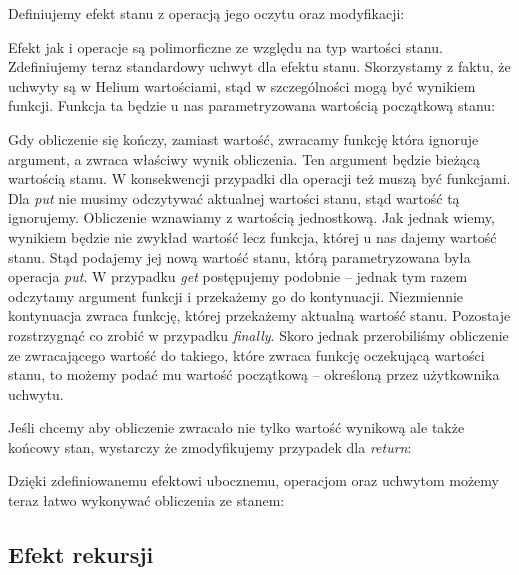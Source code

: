 Definiujemy efekt stanu z operacją jego oczytu oraz modyfikacji:



Efekt jak i operacje są polimorficzne ze względu na typ wartości stanu. Zdefiniujemy teraz standardowy uchwyt dla efektu stanu. Skorzystamy z faktu, że uchwyty są w Helium wartościami, stąd w szczególności mogą być wynikiem funkcji. Funkcja ta będzie u nas parametryzowana wartością początkową stanu:



Gdy obliczenie się kończy, zamiast wartość, zwracamy funkcję która ignoruje argument, a zwraca właściwy wynik obliczenia. Ten argument będzie bieżącą wartością stanu. W konsekwencji przypadki dla operacji też muszą być funkcjami. Dla \textit{put} nie musimy odczytywać aktualnej wartości stanu, stąd wartość tą ignorujemy. Obliczenie wznawiamy z wartością jednostkową. Jak jednak wiemy, wynikiem będzie nie zwykład wartość lecz funkcja, której u nas dajemy wartość stanu. Stąd podajemy jej nową wartość stanu, którą parametryzowana była operacja \textit{put}. W przypadku \textit{get} postępujemy podobnie -- jednak tym razem odczytamy argument funkcji i przekażemy go do kontynuacji. Niezmiennie kontynuacja zwraca funkcję, której przekażemy aktualną wartość stanu. Pozostaje rozstrzygnąć co zrobić w przypadku \textit{finally}. Skoro jednak przerobiliśmy obliczenie ze zwracającego wartość do takiego, które zwraca funkcję oczekującą wartości stanu, to możemy podać mu wartość początkową -- określoną przez użytkownika uchwytu.

Jeśli chcemy aby obliczenie zwracało nie tylko wartość wynikową ale także końcowy stan, wystarczy że zmodyfikujemy przypadek dla \textit{return}:



Dzięki zdefiniowanemu efektowi ubocznemu, operacjom oraz uchwytom możemy teraz łatwo wykonywać obliczenia ze stanem:



\subsection{Efekt rekursji}

